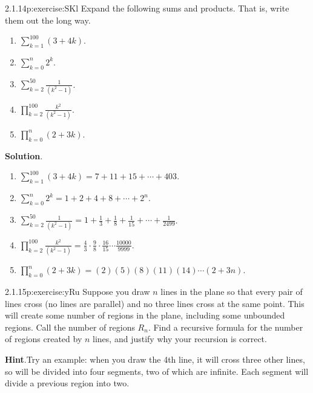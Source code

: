 \documentclass[twoside,11pt,]{book}
\newcommand{\blocktitlefont}{\relax}
\numberwithin{equation}{chapter}
\renewcommand{\d}{\displaystyle}
\begin{document}
\begin{divisionsolution}{2.1.14}{}{p:exercise:SKl}%
Expand the following sums and products. That is, write them out the long way.%
\begin{multicols}{2}
\begin{enumerate}[label=(\alph*)]
\item{}\(\d\sum_{k=1}^{100} (3+4k)\).%
\item{}\(\d\sum_{k=0}^n 2^k\).%
\item{}\(\d\sum_{k=2}^{50}\frac{1}{(k^2 - 1)}\).%
\item{}\(\d\prod_{k=2}^{100}\frac{k^2}{(k^2-1)}\).%
\item{}\(\d\prod_{k=0}^n (2+3k)\).%
\end{enumerate}
\end{multicols}
%
\par\smallskip%
\noindent\textbf{\blocktitlefont Solution}.\quad{}%
\begin{enumerate}[label=(\alph*)]
\item{}\(\d\sum_{k=1}^{100} (3+4k) = 7 + 11 + 15 + \cdots + 403\).%
\item{}\(\d\sum_{k=0}^n 2^k = 1 + 2 + 4 + 8 + \cdots + 2^n\).%
\item{}\(\d\sum_{k=2}^{50}\frac{1}{(k^2 - 1)} = 1 + \frac{1}{3} + \frac{1}{8} + \frac{1}{15} + \cdots + \frac{1}{2499}\).%
\item{}\(\d\prod_{k=2}^{100}\frac{k^2}{(k^2-1)} = \frac{4}{3}\cdot\frac{9}{8}\cdot\frac{16}{15}\cdots\frac{10000}{9999}\).%
\item{}\(\d\prod_{k=0}^n (2+3k) = (2)(5)(8)(11)(14)\cdots(2+3n)\).%
\end{enumerate}
%
\end{divisionsolution}%
\begin{divisionsolution}{2.1.15}{}{p:exercise:yRu}%
Suppose you draw \(n\) lines in the plane so that every pair of lines cross (no lines are parallel) and no three lines cross at the same point.  This will create some number of regions in the plane, including some unbounded regions.  Call the number of regions \(R_n\).  Find a recursive formula for the number of regions created by \(n\) lines, and justify why your recursion is correct.%
\par\smallskip%
\noindent\textbf{\blocktitlefont Hint}.\quad{}Try an example: when you draw the 4th line, it will cross three other lines, so will be divided into four segments, two of which are infinite.  Each segment will divide a previous region into two.%
\end{divisionsolution}%
\end{document}
